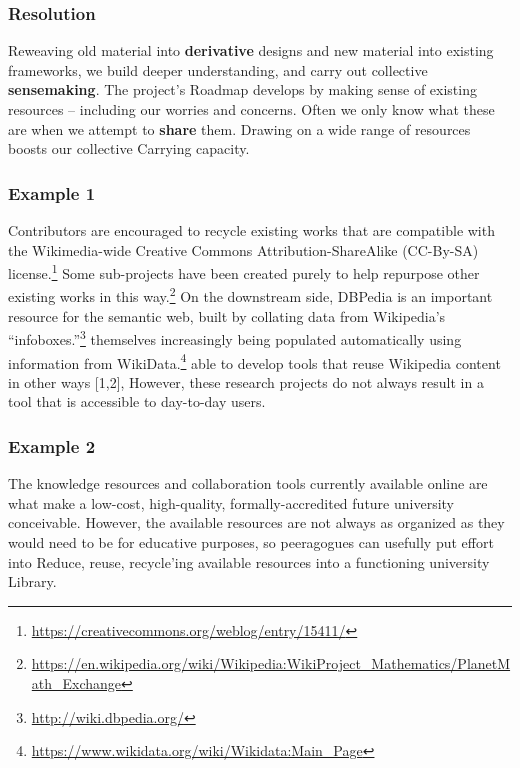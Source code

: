 \hypertarget{resolution}{%
\subsubsection{Resolution}\label{resolution}}

Reweaving old material into \textbf{derivative} designs and new material
into existing frameworks, we build deeper understanding, and carry out
collective \textbf{sensemaking}. The project's {{Roadmap}} develops by
making sense of existing resources -- including our worries and
concerns. Often we only know what these are when we attempt to
\textbf{share} them. Drawing on a wide range of resources boosts our
collective {{Carrying capacity}}.

\hypertarget{example-1}{%
\subsubsection{Example 1}\label{example-1}}

Contributors are encouraged to recycle existing works that are
compatible with the Wikimedia-wide Creative Commons
Attribution-ShareAlike (CC-By-SA) license.\footnote{\url{https://creativecommons.org/weblog/entry/15411/}}
Some sub-projects have been created purely to help repurpose other
existing works in this way.\footnote{\url{https://en.wikipedia.org/wiki/Wikipedia:WikiProject_Mathematics/PlanetMath_Exchange}}
On the downstream side, DBPedia is an important resource for the
semantic web, built by collating data from Wikipedia's
``infoboxes.''\footnote{\url{http://wiki.dbpedia.org/}} themselves
increasingly being populated automatically using information from
WikiData.\footnote{\url{https://www.wikidata.org/wiki/Wikidata:Main_Page}}
able to develop tools that reuse Wikipedia content in other ways
{{[}1,2{]}}, However, these research projects do not always result in a
tool that is accessible to day-to-day users.

\hypertarget{example-2}{%
\subsubsection{Example 2}\label{example-2}}

The knowledge resources and collaboration tools currently available
online are what make a low-cost, high-quality, formally-accredited
future university conceivable. However, the available resources are not
always as organized as they would need to be for educative purposes, so
peeragogues can usefully put effort into {{Reduce, reuse, recycle}}'ing
available resources into a functioning university Library.

